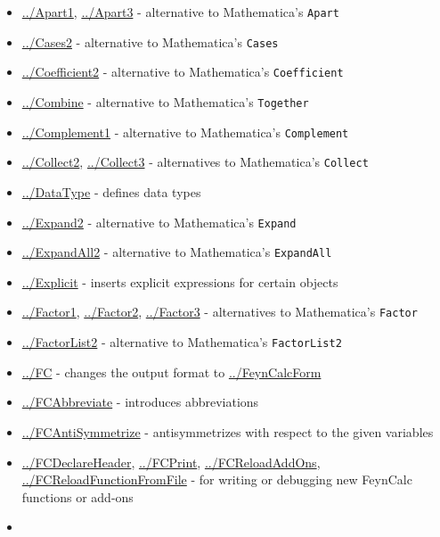 \documentclass[../FeynCalcManual.tex]{subfiles}
\begin{document}
\begin{itemize}
\tightlist
\item
  \hyperlink{../apart1}{../Apart1}, \hyperlink{../apart3}{../Apart3} -
  alternative to Mathematica's \texttt{Apart}
\item
  \hyperlink{../cases2}{../Cases2} - alternative to Mathematica's
  \texttt{Cases}
\item
  \hyperlink{../coefficient2}{../Coefficient2} - alternative to
  Mathematica's \texttt{Coefficient}
\item
  \hyperlink{../combine}{../Combine} - alternative to Mathematica's
  \texttt{Together}
\item
  \hyperlink{../complement1}{../Complement1} - alternative to
  Mathematica's \texttt{Complement}
\item
  \hyperlink{../collect2}{../Collect2},
  \hyperlink{../collect3}{../Collect3} - alternatives to Mathematica's
  \texttt{Collect}
\item
  \hyperlink{../datatype}{../DataType} - defines data types
\item
  \hyperlink{../expand2}{../Expand2} - alternative to Mathematica's
  \texttt{Expand}
\item
  \hyperlink{../expandall2}{../ExpandAll2} - alternative to
  Mathematica's \texttt{ExpandAll}
\item
  \hyperlink{../explicit}{../Explicit} - inserts explicit expressions
  for certain objects
\item
  \hyperlink{../factor1}{../Factor1},
  \hyperlink{../factor2}{../Factor2}, \hyperlink{../factor3}{../Factor3}
  - alternatives to Mathematica's \texttt{Factor}
\item
  \hyperlink{../factorlist2}{../FactorList2} - alternative to
  Mathematica's \texttt{FactorList2}
\item
  \hyperlink{../fc}{../FC} - changes the output format to
  \hyperlink{../feyncalcform}{../FeynCalcForm}
\item
  \hyperlink{../fcabbreviate}{../FCAbbreviate} - introduces
  abbreviations
\item
  \hyperlink{../fcantisymmetrize}{../FCAntiSymmetrize} - antisymmetrizes
  with respect to the given variables
\item
  \hyperlink{../fcdeclareheader}{../FCDeclareHeader},
  \hyperlink{../fcprint}{../FCPrint},
  \hyperlink{../fcreloadaddons}{../FCReloadAddOns},
  \hyperlink{../fcreloadfunctionfromfile}{../FCReloadFunctionFromFile} -
  for writing or debugging new FeynCalc functions or add-ons
\item

\end{itemize}
\end{document}

